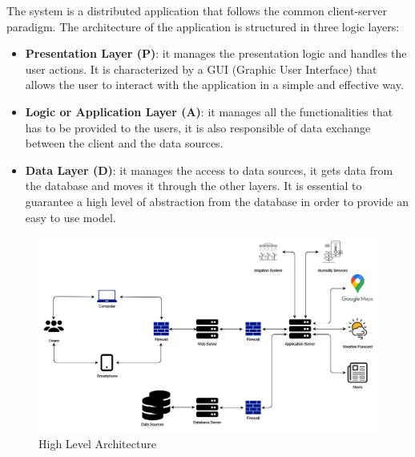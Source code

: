 \documentclass[table, 12pt]{article}
\begin{document}
The system is a distributed application that follows the common client-server paradigm.
The architecture of the application is structured in three logic layers:
\begin{itemize}
    \item \textbf{Presentation Layer (P)}: it manages the presentation logic and handles the user actions.
    It is characterized by a GUI (Graphic User Interface) that allows the user to interact with the application in a simple and effective way.
    \item \textbf{Logic or Application Layer (A)}: it manages all the functionalities that has to be provided to the users, it is also responsible of data exchange between the client and the data sources.
    \item \textbf{Data Layer (D)}: it manages the access to data sources, it gets data from the database and moves it through the other layers.
    It is essential to guarantee a high level of abstraction from the database in order to provide an easy to use model.
\end{itemize}

\begin{center}
    \begin{figure}[H]
        \includegraphics[scale=0.70, center]{assets/4-tier-architecture-scheme.png}
        \caption{High Level Architecture}
        \label{fig: high_level_architecture}
    \end{figure}
\end{center}
\end{document}
